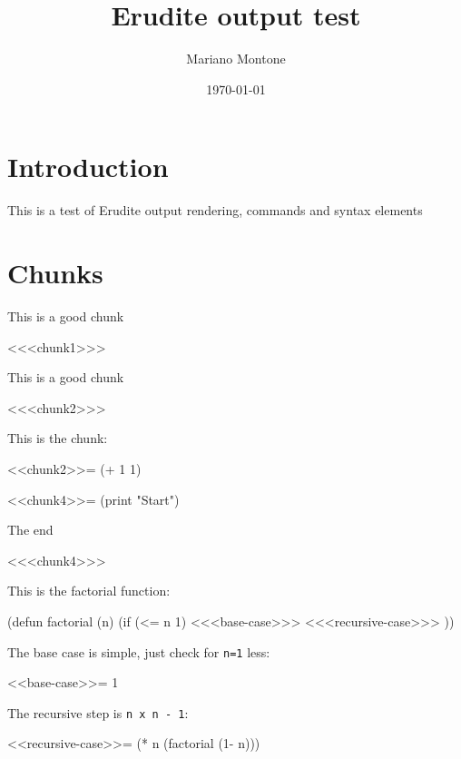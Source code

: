 \documentclass[11pt,pdflatex,makeidx]{scrbook}   %
\begin{document}
\title{\bf Erudite output test}


\author{Mariano Montone}

\date{\today}                           %
\frontmatter                            %
\maketitle                              %
\tableofcontents                        %
\mainmatter                             %
\long\def\ignore#1{}

\section{Introduction}

This is a test of Erudite output rendering, commands and syntax elements

\section{Chunks}

This is a good chunk
\begin{code}
<<<chunk1>>>
\end{code}

This is a good chunk
\begin{code}
<<<chunk2>>>
\end{code}
This is the chunk:
\begin{code}
<<chunk2>>=
(+ 1 1)

\end{code}

\begin{code}
<<chunk4>>=
(print "Start")

\end{code}
The end
\begin{code}
<<<chunk4>>>
\end{code}

This is the factorial function:
\begin{code}
(defun factorial (n)
  (if (<= n 1)
<<<base-case>>>
<<<recursive-case>>>
      ))

\end{code}
The base case is simple, just check for \verb|n=1| less:
\begin{code}
<<base-case>>=
      1

\end{code}
The recursive step is \verb|n x n - 1|:
\begin{code}
<<recursive-case>>=
      (* n (factorial (1- n)))

\end{code}
\end{document}
